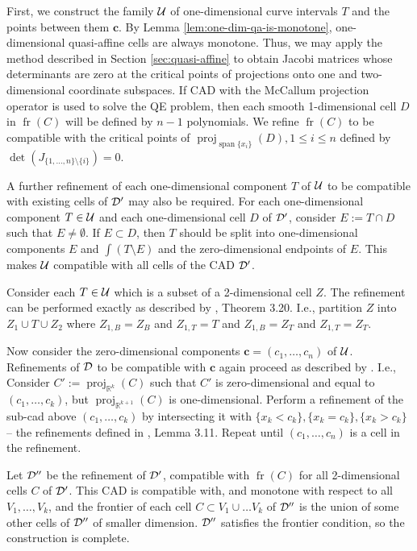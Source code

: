 \documentclass[
]{book}
\theoremstyle{definition}
\theoremstyle{definition}
\theoremstyle{definition}
\theoremstyle{definition}
\theoremstyle{remark}
\begin{document}
First, we construct the family \(\cal U\) of one-dimensional curve intervals \(T\) and the points between them \(\mathbf{c}\). By Lemma \ref{lem:one-dim-qa-is-monotone}, one-dimensional quasi-affine cells are always monotone. Thus, we may apply the method described in Section \ref{sec:quasi-affine} to obtain Jacobi matrices whose determinants are zero at the critical points of projections onto one and two-dimensional coordinate subspaces.
If CAD with the McCallum projection operator is used to solve the QE problem, then each smooth 1-dimensional cell \(D\) in \({\operatorname{fr} \left( C \right)}\) will be defined by \(n-1\) polynomials. We refine \({\operatorname{fr} \left( C \right)}\) to be compatible with the critical points of \({\operatorname{proj}_{{\operatorname{span} \{x_i\}}}}(D), 1\le i \le n\) defined by \(\det(J_{\{1,\ldots,n\}\setminus \{i\}}) = 0\).

A further refinement of each one-dimensional component \(T\) of \(\cal U\) to be compatible with existing cells of \(\cal D'\) may also be required.
For each one-dimensional component \(T \in {\cal U}\) and each one-dimensional cell \(D\) of \(\cal D'\), consider \(E := T \cap D\) such that \(E \ne \emptyset\).
If \(E \subset D\), then \(T\) should be split into one-dimensional components \(E\) and \(\int(T \setminus E)\) and the zero-dimensional endpoints of \(E\). This makes \(\cal U\) compatible with all cells of the CAD \(\cal D'\).

Consider each \(T \in {\cal U}\) which is a subset of a 2-dimensional cell \(Z\). The refinement can be performed exactly as described by \citet{bgv15}, Theorem 3.20. I.e., partition \(Z\) into \(Z_1 \cup T \cup Z_2\) where \(Z_{1,B}=Z_B\) and \(Z_{1,T} = T\) and \(Z_{1,B}=Z_T\) and \(Z_{1,T} = Z_T\).

Now consider the zero-dimensional components \(\mathbf{c} = (c_1,\ldots,c_n)\) of \(\cal U\). Refinements of \(\cal D\) to be compatible with \(\mathbf{c}\) again proceed as described by \citet{bgv15}. I.e., Consider \(C' := {\operatorname{proj}_{\mathbb{R}^{k}}}(C)\) such that \(C'\) is zero-dimensional and equal to \((c_1,\ldots,c_k)\), but \({\operatorname{proj}_{\mathbb{R}^{k+1}}}(C)\) is one-dimensional. Perform a refinement of the sub-cad above \((c_1,\ldots,c_k)\) by intersecting it with \(\{ x_k < c_k \}, \{ x_k = c_k \}, \{ x_k > c_k \}\) -- the refinements defined in \citet{bgv15}, Lemma 3.11. Repeat until \((c_1,\ldots,c_n)\) is a cell in the refinement.

Let \(\cal D''\) be the refinement of \(\cal D'\), compatible with \({\operatorname{fr} \left( C \right)}\) for all 2-dimensional cells \(C\) of \(\cal D'\). This CAD is compatible with, and monotone with respect to all \(V_1,\ldots,V_k\), and the frontier of each cell \(C \subset V_1\cup \ldots V_k\) of \(\cal D''\) is the union of some other cells of \(\cal D''\) of smaller dimension.
\(\cal D''\) satisfies the frontier condition, so the construction is complete.
\end{document}
